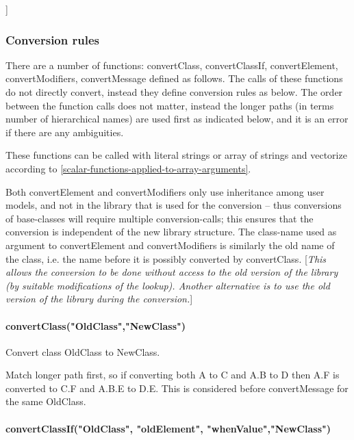 \documentclass[10pt,a4paper]{report}
\def\doublelabel#1{\label{#1}\hypertarget{#1}{}}
\begin{document}
{]}

\subsubsection{Conversion rules}\doublelabel{conversion-rules}

There are a number of functions: convertClass, convertClassIf,
convertElement, convertModifiers, convertMessage defined as follows. The
calls of these functions do not directly convert, instead they define
conversion rules as below. The order between the function calls does not
matter, instead the longer paths (in terms number of hierarchical names)
are used first as indicated below, and it is an error if there are any
ambiguities.

These functions can be called with literal strings or array of strings
and vectorize according to \ref{scalar-functions-applied-to-array-arguments}.

Both convertElement and convertModifiers only use inheritance among user
models, and not in the library that is used for the conversion -- thus
conversions of base-classes will require multiple conversion-calls; this
ensures that the conversion is independent of the new library structure.
The class-name used as argument to convertElement and convertModifiers
is similarly the old name of the class, i.e. the name before it is
possibly converted by convertClass. {[}\emph{This allows the conversion
to be done without access to the old version of the library (by suitable
modifications of the lookup). Another alternative is to use the old
version of the library during the conversion.}{]}

\paragraph{convertClass("OldClass","NewClass")}\doublelabel{convertclassoldclassnewclass}

Convert class OldClass to NewClass.

Match longer path first, so if converting both A to C and A.B to D then
A.F is converted to C.F and A.B.E to D.E. This is considered before
convertMessage for the same OldClass.

\paragraph{convertClassIf("OldClass", "oldElement", "whenValue","NewClass")}\doublelabel{convertclassifoldclass-oldelement-whenvalue-newclass}
\end{document}
